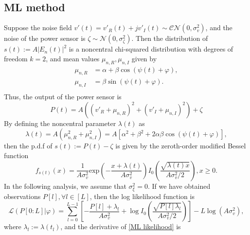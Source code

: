 \documentclass[12pt,draftclsnofoot,journal,onecolumn]{IEEEtran}
\theoremstyle{nonumberplain}
\def \exp {\text{exp}}
\begin{document}
\subsection{ML method}
    Suppose the noise field $v'(t)=v'_R(t) + jv'_I(t)\sim \mathcal{CN}(0, \sigma_v^2)$, and the noise of the power sensor is $\zeta \sim \mathcal{N}(0, \sigma_{\zeta}^2)$. Then the distribution of $s(t) := A\left|E_n(t)\right|^2$ is a noncentral chi-squared distribution with degrees of freedom $k=2$, and mean values $\mu_{n,R}, \mu_{n,I}$ given by
    \begin{equation}
        \begin{aligned}
        \mu_{n,R} & = \alpha + \beta \cos(\psi(t)+\varphi),    \\ 
        \mu_{n,I} & = \beta \sin(\psi(t)+\varphi).   \\
        \end{aligned}
    \end{equation}
    Thus, the output of the power sensor is 
    \begin{equation}
        P(t)  = A\left((v'_{R} + \mu_{n,R})^2 + (v'_{I} + \mu_{n,I})^2 \right)+ \zeta 
        \label{eqn:sensor power}
    \end{equation}
    By defining the noncentral parameter $\lambda(t)$ as
    \begin{equation}
        \lambda(t)  = A(\mu_{n,R}^2 + \mu_{n,I}^2) = A\left[\alpha^{2}+\beta^{2}+2\alpha\beta\cos\left(\psi(t)+\varphi\right)\right],
    \end{equation}
    then the p.d.f of $s(t) := P(t)-\zeta$ is given by the zeroth-order modified Bessel function
    \begin{equation}
        f_{s(t)}(x) = \frac{1}{A\sigma_{v}^2} \exp\left(-\frac{x+\lambda(t)}{A\sigma_v^2}\right)I_{0}\left(\frac{\sqrt{\lambda(t) x}}{A\sigma_v^2/2}\right), x \geq 0.
        \label{ML single observation}
    \end{equation}
    In the following analysis, we assume that $\sigma_{\xi}^2 = 0$. If we have obtained observations $P[l], \forall l\in [L]$, then the log likelihood function is 
    \begin{equation}
        \mathcal{L}(P[0:L] | \varphi) = \sum_{l=0}^{L-1}\left[-\frac{P[l] + \lambda_l}{A\sigma_v^2} + \log I_0\left(\frac{\sqrt{P[l] \lambda_l}}{A\sigma_v^2/2}\right)\right] - L\log(A\sigma_v^2),
        \label{ML likelihood}
    \end{equation}
    where $\lambda_l := \lambda(t_l)$, and the derivative of \eqref{ML likelihood} is 
\end{document}
